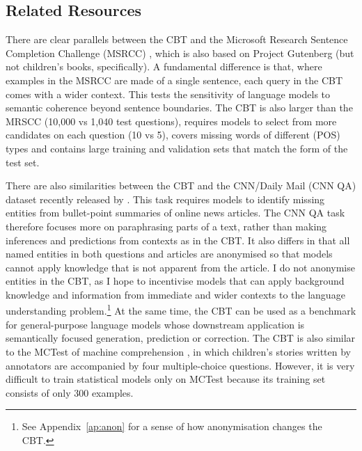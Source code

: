  


\subsection{Related Resources}
There are clear parallels between the CBT and the Microsoft Research Sentence Completion Challenge (MSRCC) \citep{zweig2011microsoft}, which is also based on Project Gutenberg (but not children's books, specifically). A fundamental difference is that, where examples in the MSRCC are made of a single sentence, each query in the CBT comes with a wider context. This tests the sensitivity of language models to semantic coherence beyond sentence boundaries. The CBT is also larger than the MRSCC (10,000 vs 1,040 test questions), requires models to select from more candidates on each question (10 vs 5), covers missing words of different (POS) types and contains large training and validation sets that match the form of the test set. 

There are also similarities between the CBT and the CNN/Daily Mail (CNN QA) dataset recently released by \cite{nips15_hermann}. This task requires models to identify missing entities from bullet-point summaries of online news articles. The CNN QA task therefore focuses more on paraphrasing parts of a text, rather than making inferences and predictions from contexts as in the CBT. It also differs in that all named entities in both questions and articles are anonymised so that models cannot apply knowledge that is not apparent from the article. I do not anonymise entities in the CBT, as I hope to incentivise models that can apply background knowledge and information from immediate and wider contexts to the language understanding problem.\footnote{See Appendix~\ref{ap:anon} for a sense of how anonymisation changes the CBT.} At the same time, the CBT can be used as a benchmark for general-purpose language models whose downstream application is semantically focused generation, prediction or correction. 
%
The CBT is also similar to the MCTest of machine comprehension \citep{richardson2013mctest}, in which children's stories written by annotators are accompanied by four multiple-choice questions. However, it is very difficult to train statistical models only on MCTest because its training set consists of only 300 examples.

